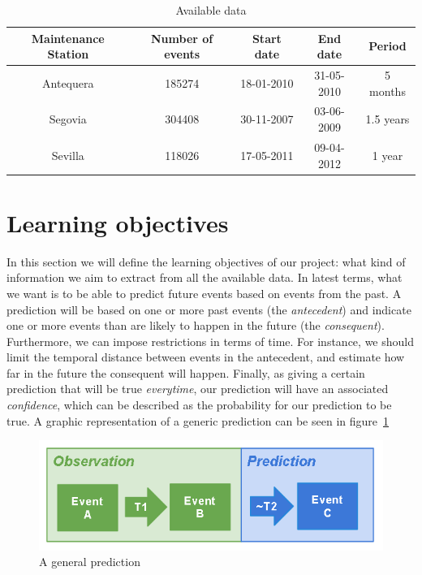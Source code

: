 \documentclass[a4paper,10pt]{report}
\begin{document}
\begin{table}
\begin{center}
\begin{tabular}{|c|c|c|c|c|}
\hline Maintenance Station & Number of events & Start date & End date & Period \\ 
\hline Antequera & 185274 & 18-01-2010 & 31-05-2010 &  5 months \\ 
\hline Segovia & 304408 & 30-11-2007 & 03-06-2009 &  1.5 years \\ 
\hline Sevilla & 118026 & 17-05-2011 & 09-04-2012 &  1 year \\ 
\hline 
\end{tabular}
\end{center} 
\caption {Available data} \label{tab:data_details} 
\end{table}

\section{Learning objectives}
In this section we will define the learning objectives of our project: what kind of information we aim to extract from all the available data. In latest terms, what we want is to be able to predict future events based on events from the past. A prediction will be based on one or more past events (the \emph{antecedent}) and indicate one or more events than are likely to happen in the future (the \emph{consequent}). Furthermore, we can impose restrictions in terms of time. For instance, we should limit the temporal distance between events in the antecedent, and estimate how far in the future the consequent will happen. Finally, as giving a certain prediction that will be true \emph{everytime}, our prediction will have an associated \emph{confidence}, which can be described as the probability for our prediction to be true. A graphic representation of a generic prediction can be seen in figure~\ref{fig:ass_rule}

\begin{figure}[hbtp]
\includegraphics[width=\textwidth]{./img/association_rules.png}
\caption{A general prediction} \label{fig:ass_rule}
\end{figure}
\end{document}
